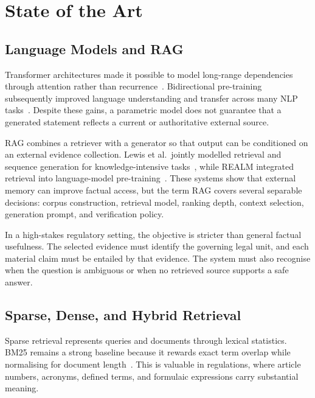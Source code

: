 \chapter{State of the Art}
\label{chap:sota}


\section{Language Models and RAG}

Transformer architectures made it possible to model long-range dependencies through attention rather than recurrence~\cite{vaswani2017attention}. Bidirectional pre-training subsequently improved language understanding and transfer across many \ac{NLP} tasks~\cite{devlin2019bert}. Despite these gains, a parametric model does not guarantee that a generated statement reflects a current or authoritative external source.

\ac{RAG} combines a retriever with a generator so that output can be conditioned on an external evidence collection. Lewis et al.\ jointly modelled retrieval and sequence generation for knowledge-intensive tasks~\cite{lewis2020rag}, while REALM integrated retrieval into language-model pre-training~\cite{guu2020realm}. These systems show that external memory can improve factual access, but the term RAG covers several separable decisions: corpus construction, retrieval model, ranking depth, context selection, generation prompt, and verification policy.

In a high-stakes regulatory setting, the objective is stricter than general factual usefulness. The selected evidence must identify the governing legal unit, and each material claim must be entailed by that evidence. The system must also recognise when the question is ambiguous or when no retrieved source supports a safe answer.

\section{Sparse, Dense, and Hybrid Retrieval}

Sparse retrieval represents queries and documents through lexical statistics. BM25 remains a strong baseline because it rewards exact term overlap while normalising for document length~\cite{robertson2009bm25}. This is valuable in regulations, where article numbers, acronyms, defined terms, and formulaic expressions carry substantial meaning.

